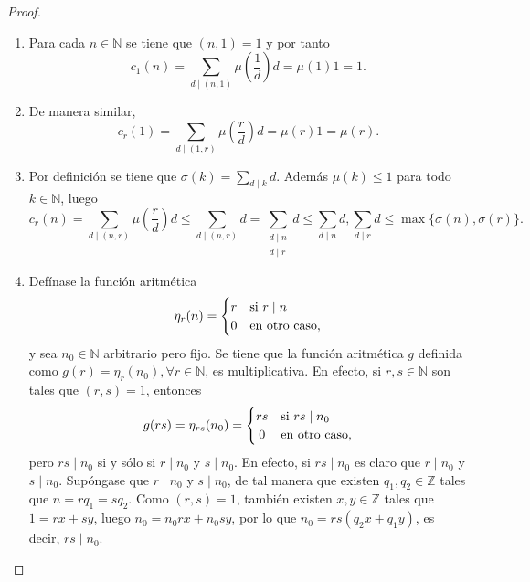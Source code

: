 \begin{proof}
\begin{enumerate}[label=\textnormal{(\arabic*)}]
\item Para cada $n \in \mathbb{N}$ se tiene que $(n,1)=1$ y por tanto
    \begin{equation*}
        c_1(n) = \sum_{d \mid (n,1)} \mu \left( \frac{1}{d} \right) d = \mu(1) 1 = 1.
    \end{equation*}
\item De manera similar,
    \begin{equation*}
        c_r(1) = \sum_{d \mid (1,r)} \mu \left( \frac{r}{d} \right) d = \mu(r) 1 = \mu(r).
    \end{equation*}
\item Por definición se tiene que $\sigma(k) = \sum_{d \mid k} d$. Además $\mu(k) \le 1$ para todo $k \in \mathbb{N}$, luego
    \begin{equation*}
        c_r(n) = \sum_{d \mid (n,r)} \mu \left( \frac{r}{d} \right) d \le \sum_{d \mid (n,r)} d = \sum_{\substack{d \mid n \\ d \mid r}} d \le \sum_{d \mid n} d, \sum_{d \mid r} d \le \max \{ \sigma(n),\sigma(r) \}.
    \end{equation*}
\item Defínase la función aritmética
    \begin{equation*}
        \eta_r(n) = \begin{cases}
            \hfil r & \text{si } r \mid n \\
            \hfil 0 & \text{en otro caso},
        \end{cases}
    \end{equation*}
y sea $n_0 \in \mathbb{N}$ arbitrario pero fijo. Se tiene que la función aritmética $g$ definida como $g(r) = \eta_r(n_0), \forall r \in \mathbb{N}$, es multiplicativa. En efecto, si $r,s \in \mathbb{N}$ son tales que $(r,s)=1$, entonces
\begin{equation*}
    g(r s ) = \eta_{r s}(n_0) = \begin{cases}
        \hfil r s & \text{si } r s \mid n_0 \\
        \hfil 0 & \text{en otro caso,}
    \end{cases}
\end{equation*}
pero $r s \mid n_0$ si y sólo si $r \mid n_0$ y $s \mid n_0$. En efecto, si $r s \mid n_0$ es claro que $r \mid n_0$ y $s \mid n_0$. Supóngase que $r \mid n_0$ y $s \mid n_0$, de tal manera que existen $q_1, q_2 \in \mathbb{Z}$ tales que $n=r q_1=s q_2$. Como $(r,s)=1$, también existen $x, y \in \mathbb{Z}$ tales que $1=r x + s y$, luego $n_0=n_0 r x + n_0 s y$, por lo que $n_0= r s (q_2 x + q_1 y)$, es decir, $r s \mid n_0$.
\bigskip


\end{enumerate}
\end{proof}
